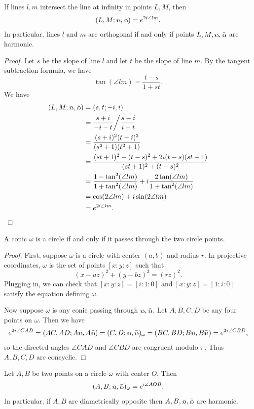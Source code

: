 \begin{thm} If lines $l, m$ intersect the line at infinity in points $L,M$, then
\[
(L,M;\fish,\bar\fish) = e^{2i\angle lm}.
\]
In particular, lines $l$ and $m$ are orthogonal if and only if points $L,M,\fish,\bar\fish$ are harmonic.
\end{thm}
\begin{proof} Let $s$ be the slope of line $l$ and let $t$ be the slope of line $m$. By the tangent subtraction formula, we have
\[
\tan(\angle lm) = \frac{t-s}{1+st}.
\]
We have
\begin{align*}
(L,M;\fish,\bar\fish) &= (s,t;-i,i)\\
&= \frac{s+i}{-i-t}\bigg/\frac{s-i}{i-t}\\
&= \frac{(s+i)^2(t-i)^2}{(s^2+1)(t^2+1)}\\
&= \frac{(st+1)^2 - (t-s)^2 + 2i(t-s)(st+1)}{(st+1)^2 + (t-s)^2}\\
&= \frac{1-\tan^2(\angle lm)}{1+\tan^2(\angle lm)} + i\frac{2\tan(\angle lm)}{1+\tan^2(\angle lm)}\\
&= \cos(2\angle lm) + i\sin(2\angle lm)\\
&= e^{2i\angle lm}.\qedhere
\end{align*}
\end{proof}

\begin{thm} A conic $\omega$ is a circle if and only if it passes through the two circle points.
\end{thm}
\begin{proof} First, suppose $\omega$ is a circle with center $(a,b)$ and radius $r$. In projective coordinates, $\omega$ is the set of points $[x:y:z]$ such that
\[
(x-az)^2 + (y-bz)^2 = (rz)^2.
\]
Plugging in, we can check that $[x:y:z] = [i:1:0]$ and $[x:y:z] = [1:i:0]$ satisfy the equation defining $\omega$.

Now suppose $\omega$ is any conic passing through $\fish,\bar\fish$. Let $A,B,C,D$ be any four points on $\omega$. Then we have
\[
e^{2i\angle CAD} = (AC,AD;A\fish,A\bar\fish) = (C,D;\fish,\bar\fish)_{\omega} = (BC,BD;B\fish,B\bar\fish) = e^{2i\angle CBD},
\]
so the directed angles $\angle CAD$ and $\angle CBD$ are congruent modulo $\pi$. Thus $A,B,C,D$ are concyclic.
\end{proof}

\begin{cor} Let $A,B$ be two points on a circle $\omega$ with center $O$. Then
\[
(A,B;\fish,\bar\fish)_\omega = e^{i\angle AOB}.
\]
In particular, if $A,B$ are diametrically opposite then $A,B,\fish,\bar\fish$ are harmonic.
\end{cor}

